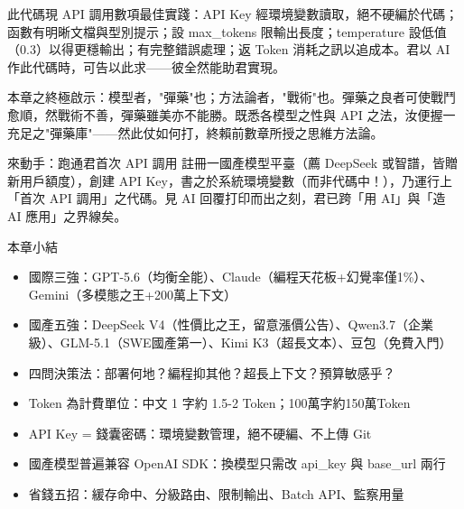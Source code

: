 此代碼現 API 調用數項最佳實踐：API Key 經環境變數讀取，絕不硬編於代碼；函數有明晰文檔與型別提示；設 max\_tokens 限輸出長度；temperature 設低值（0.3）以得更穩輸出；有完整錯誤處理；返 Token 消耗之訊以追成本。君以 AI 作此代碼時，可告以此求——彼全然能助君實現。

本章之終極啟示：模型者，"彈藥"也；方法論者，"戰術"也。彈藥之良者可使戰鬥愈順，然戰術不善，彈藥雖美亦不能勝。既悉各模型之性與 API 之法，汝便握一充足之"彈藥庫"——然此仗如何打，終賴前數章所授之思維方法論。

\begin{tcbpractice}{來動手：跑通君首次 API 調用}
註冊一國產模型平臺（薦 DeepSeek 或智譜，皆贈新用戶額度），創建 API Key，書之於系統環境變數（而非代碼中！），乃運行上「首次 API 調用」之代碼。見 AI 回覆打印而出之刻，君已跨「用 AI」與「造 AI 應用」之界線矣。

\end{tcbpractice}

\begin{tcbsummary}{本章小結}
\begin{itemize}
  \item 國際三強：GPT-5.6（均衡全能）、Claude（編程天花板+幻覺率僅1\%）、Gemini（多模態之王+200萬上下文）
  \item 國產五強：DeepSeek V4（性價比之王，留意漲價公告）、Qwen3.7（企業級）、GLM-5.1（SWE國產第一）、Kimi K3（超長文本）、豆包（免費入門）
  \item 四問決策法：部署何地？編程抑其他？超長上下文？預算敏感乎？
  \item Token 為計費單位：中文 1 字約 1.5-2 Token；100萬字約150萬Token
  \item API Key = 錢囊密碼：環境變數管理，絕不硬編、不上傳 Git
  \item 國產模型普遍兼容 OpenAI SDK：換模型只需改 api\_key 與 base\_url 兩行
  \item 省錢五招：緩存命中、分級路由、限制輸出、Batch API、監察用量
\end{itemize}

\end{tcbsummary}
